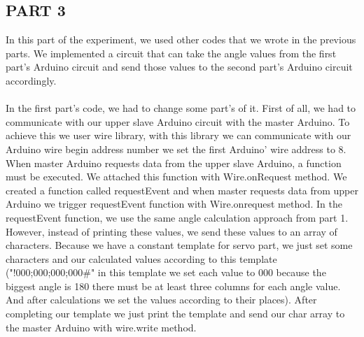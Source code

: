 \documentclass[pdftex,12pt,a4paper]{article}
\begin{document}
\begin{flushleft}
\subsection{PART 3}
In this part of the experiment, we used other codes that we wrote in the previous parts. We implemented a circuit that can take the angle values from the first part's Arduino circuit and send those values to the second part's Arduino circuit accordingly.

\paragraph{}
In the first part's code, we had to change some part's of it. First of all, we had to communicate with our upper slave Arduino circuit with the master Arduino. To achieve this we user wire library, with this library we can communicate with our Arduino wire begin address number we set the first Arduino' wire address to 8. When master Arduino requests data from the upper slave Arduino, a function must be executed. We attached this function with Wire.onRequest method. We created a function called requestEvent and when master requests data from upper Arduino we trigger requestEvent function with Wire.onrequest method. In the requestEvent function, we use the same angle calculation approach from part 1. However, instead of printing these values, we send these values to an array of characters. Because we have a constant template for servo part, we just set some characters and our calculated values according to this template ("!000;000;000;000#" in this template we set each value to 000 because the biggest angle is 180 there must be at least three columns for each angle value. And after calculations we set the values according to their places). After completing our template we just print the template and send our char array to the master Arduino with wire.write method.


\end{flushleft}
\end{document}
